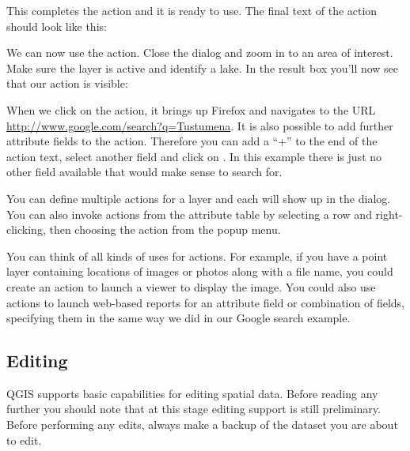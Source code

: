 This completes the action and it is ready to use. The final text of the action
should look like this:

\begin{center}
\end{center}

We can now use the action. Close the  dialog and zoom in to an area
of interest. Make sure the  layer is active and identify a
lake. In the result box you'll now see that our action is visible:


When we click on the action, it brings up Firefox and navigates to the URL
\url{http://www.google.com/search?q=Tustumena}. It is also possible to add further 
attribute fields to the action. Therefore you can add a ``+'' to the end of the action 
text, select another field and click on . In this example there 
is just no other field available that would make sense to search for.

You can define multiple actions for a layer and each will show up in the
 dialog. You can also invoke actions from the attribute table
by selecting a row and right-clicking, then choosing the action from the popup
menu.

You can think of all kinds of uses for actions. For example, if you have a point layer
containing locations of images or photos along with a file name, you could
create an action to launch a viewer to display the image. You could also use
actions to launch web-based reports for an attribute field or combination of
fields, specifying them in the same way we did in our Google search example.

\subsection{Editing}

QGIS supports basic capabilities for editing spatial data.  Before reading any
further you should note that at this stage editing support is still preliminary.
Before performing any edits, always make a backup of the dataset you are about
to edit. 

